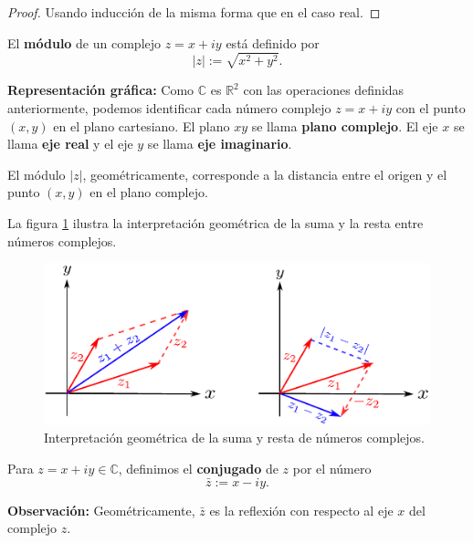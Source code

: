 \begin{proof}
Usando inducción de la misma forma que en el caso real.
\end{proof}

\begin{defi}
El \textbf{módulo} de un complejo $z = x+iy$ está definido por
$$|z| := \sqrt{x^2 + y^2}.$$
\end{defi}

\textbf{Representación gráfica:} Como $\mathbb{C}$ es $\mathbb{R}^2$ con las operaciones definidas anteriormente, podemos identificar cada número complejo $z = x + iy$ con el punto $(x,y)$ en el plano cartesiano. El plano $xy$ se llama \textbf{plano complejo}. El eje $x$ se llama \textbf{eje real} y el eje $y$ se llama \textbf{eje imaginario}. 

El módulo $|z|$, geométricamente, corresponde a la distancia entre el origen y el punto $(x,y)$ en el plano complejo.

La figura \ref{SumaComplejos} ilustra la interpretación geométrica de la suma y la resta entre números complejos.

\begin{figure}[H]
    \centering
    \includegraphics[scale=0.7]{Figuras/SumaCompejos.pdf}
    \caption{Interpretación geométrica de la suma y resta de números complejos.}
    \label{SumaComplejos}
\end{figure}

\begin{defi}
Para $z = x+iy \in \mathbb{C} $, definimos el \textbf{conjugado} de $z$ por el número
$$\bar{z} := x -iy.$$
\end{defi}

\textbf{Observación:} Geométricamente, $\bar{z}$ es la reflexión con respecto al eje $x$ del complejo $z$.

